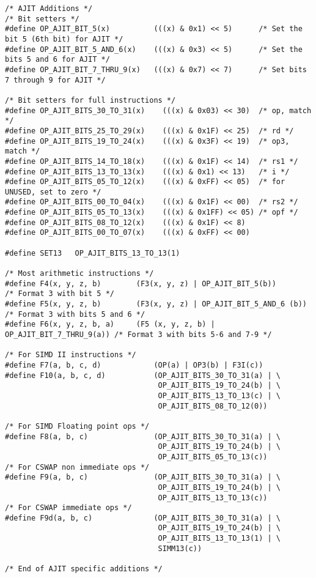 {\small
\begin{verbatim}
/* AJIT Additions */
/* Bit setters */
#define OP_AJIT_BIT_5(x)          (((x) & 0x1) << 5)      /* Set the bit 5 (6th bit) for AJIT */
#define OP_AJIT_BIT_5_AND_6(x)    (((x) & 0x3) << 5)      /* Set the bits 5 and 6 for AJIT */
#define OP_AJIT_BIT_7_THRU_9(x)   (((x) & 0x7) << 7)      /* Set bits 7 through 9 for AJIT */

/* Bit setters for full instructions */
#define OP_AJIT_BITS_30_TO_31(x)    (((x) & 0x03) << 30)  /* op, match */
#define OP_AJIT_BITS_25_TO_29(x)    (((x) & 0x1F) << 25)  /* rd */
#define OP_AJIT_BITS_19_TO_24(x)    (((x) & 0x3F) << 19)  /* op3, match */
#define OP_AJIT_BITS_14_TO_18(x)    (((x) & 0x1F) << 14)  /* rs1 */
#define OP_AJIT_BITS_13_TO_13(x)    (((x) & 0x1) << 13)   /* i */
#define OP_AJIT_BITS_05_TO_12(x)    (((x) & 0xFF) << 05)  /* for UNUSED, set to zero */
#define OP_AJIT_BITS_00_TO_04(x)    (((x) & 0x1F) << 00)  /* rs2 */
#define OP_AJIT_BITS_05_TO_13(x)    (((x) & 0x1FF) << 05) /* opf */
#define OP_AJIT_BITS_08_TO_12(x)    (((x) & 0x1F) << 8)
#define OP_AJIT_BITS_00_TO_07(x)    (((x) & 0xFF) << 00)

#define SET13   OP_AJIT_BITS_13_TO_13(1)

/* Most arithmetic instructions */
#define F4(x, y, z, b)        (F3(x, y, z) | OP_AJIT_BIT_5(b))            /* Format 3 with bit 5 */
#define F5(x, y, z, b)        (F3(x, y, z) | OP_AJIT_BIT_5_AND_6 (b))     /* Format 3 with bits 5 and 6 */
#define F6(x, y, z, b, a)     (F5 (x, y, z, b) | OP_AJIT_BIT_7_THRU_9(a)) /* Format 3 with bits 5-6 and 7-9 */

/* For SIMD II instructions */
#define F7(a, b, c, d)            (OP(a) | OP3(b) | F3I(c))
#define F10(a, b, c, d)           (OP_AJIT_BITS_30_TO_31(a) | \
                                   OP_AJIT_BITS_19_TO_24(b) | \
                                   OP_AJIT_BITS_13_TO_13(c) | \
                                   OP_AJIT_BITS_08_TO_12(0))

/* For SIMD Floating point ops */
#define F8(a, b, c)               (OP_AJIT_BITS_30_TO_31(a) | \
                                   OP_AJIT_BITS_19_TO_24(b) | \
                                   OP_AJIT_BITS_05_TO_13(c))
/* For CSWAP non immediate ops */
#define F9(a, b, c)               (OP_AJIT_BITS_30_TO_31(a) | \
                                   OP_AJIT_BITS_19_TO_24(b) | \
                                   OP_AJIT_BITS_13_TO_13(c))
/* For CSWAP immediate ops */
#define F9d(a, b, c)              (OP_AJIT_BITS_30_TO_31(a) | \
                                   OP_AJIT_BITS_19_TO_24(b) | \
                                   OP_AJIT_BITS_13_TO_13(1) | \
                                   SIMM13(c))

/* End of AJIT specific additions */
\end{verbatim}
}

